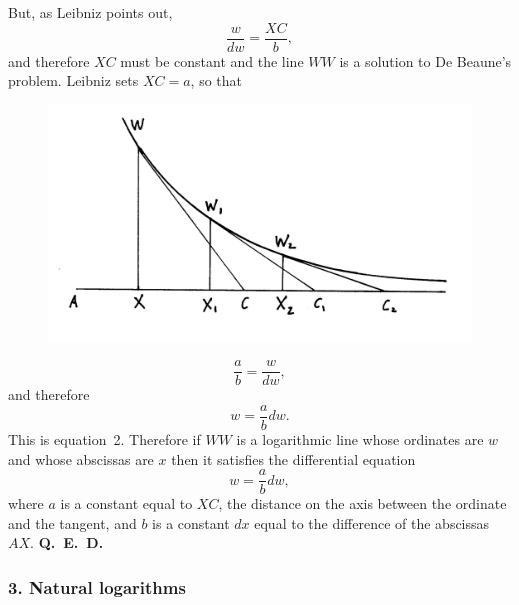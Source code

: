 \documentclass[polutonikogreek,english,twoside,openright]{article}
\begin{document}
But, as Leibniz points out,
$$\frac{w}{dw} = \frac{XC}{b},$$ and therefore $XC$ must be constant
and the line $WW$ is a solution to De Beaune's problem.  Leibniz sets
$XC =a$, so that 
 \begin{figure}[htp]
   \begin{center}
     \includegraphics[width=.85\textwidth]{fig/Figure26A}
     \caption{}
     \vspace{-10pt}
   \end{center}
\end{figure} 
$$\frac{a}{b} = \frac{w}{dw},$$
and therefore
$$w = \frac{a}{b}dw.$$
This is equation~2.  Therefore if $WW$ is a logarithmic line whose
ordinates are $w$ and whose abscissas are $x$ then it satisfies the
differential equation
$$w = \frac{a}{b}dw,$$
where $a$ is a constant equal to $XC$, the distance on the axis
between the ordinate and the tangent, and $b$ is a constant $dx$ equal
to the difference of the abscissas $AX$.  {\bf Q.\ E.\ D.}
\vspace{.5\baselineskip}


\subsubsection*{3. Natural logarithms}
\end{document}
